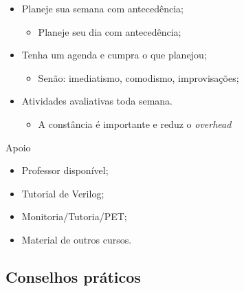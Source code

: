 \begin{frame}{\insertsubsection} 
	\begin{itemize}
		\item Planeje sua semana com antecedência; 
		\begin{itemize}
		    \item Planeje seu dia com antecedência;
		\end{itemize}
		\item Tenha um agenda e cumpra o que planejou; 
		\begin{itemize}
		    \item Senão: imediatismo, comodismo, improvisações;
		\end{itemize}
		\item Atividades avaliativas toda semana.
		\begin{itemize}
		    \item A constância é importante e reduz o \textit{overhead}
		\end{itemize}
	\end{itemize}
\end{frame}


\begin{frame}{Apoio}
    \begin{itemize}
        \item Professor disponível;
        \item Tutorial de Verilog;
        \item Monitoria/Tutoria/PET;
        \item Material de outros cursos.
    \end{itemize}
\end{frame}





\subsection{Conselhos práticos} %

